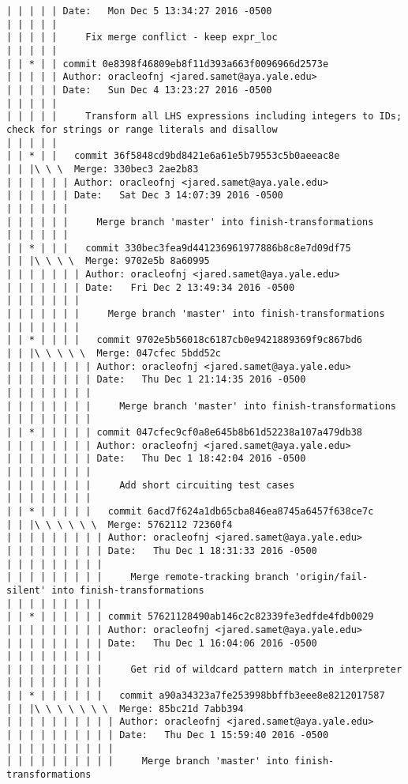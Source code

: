 \begin{lstlisting}
| | | | | Date:   Mon Dec 5 13:34:27 2016 -0500
| | | | | 
| | | | |     Fix merge conflict - keep expr_loc
| | | | |      
| | * | | commit 0e8398f46809eb8f11d393a663f0096966d2573e
| | | | | Author: oracleofnj <jared.samet@aya.yale.edu>
| | | | | Date:   Sun Dec 4 13:23:27 2016 -0500
| | | | | 
| | | | |     Transform all LHS expressions including integers to IDs; check for strings or range literals and disallow
| | | | |        
| | * | |   commit 36f5848cd9bd8421e6a61e5b79553c5b0aeeac8e
| | |\ \ \  Merge: 330bec3 2ae2b83
| | | | | | Author: oracleofnj <jared.samet@aya.yale.edu>
| | | | | | Date:   Sat Dec 3 14:07:39 2016 -0500
| | | | | | 
| | | | | |     Merge branch 'master' into finish-transformations
| | | | | |         
| | * | | |   commit 330bec3fea9d441236961977886b8c8e7d09df75
| | |\ \ \ \  Merge: 9702e5b 8a60995
| | | | | | | Author: oracleofnj <jared.samet@aya.yale.edu>
| | | | | | | Date:   Fri Dec 2 13:49:34 2016 -0500
| | | | | | | 
| | | | | | |     Merge branch 'master' into finish-transformations
| | | | | | |          
| | * | | | |   commit 9702e5b56018c6187cb0e9421889369f9c867bd6
| | |\ \ \ \ \  Merge: 047cfec 5bdd52c
| | | | | | | | Author: oracleofnj <jared.samet@aya.yale.edu>
| | | | | | | | Date:   Thu Dec 1 21:14:35 2016 -0500
| | | | | | | | 
| | | | | | | |     Merge branch 'master' into finish-transformations
| | | | | | | |         
| | * | | | | | commit 047cfec9cf0a8e645b8b61d52238a107a479db38
| | | | | | | | Author: oracleofnj <jared.samet@aya.yale.edu>
| | | | | | | | Date:   Thu Dec 1 18:42:04 2016 -0500
| | | | | | | | 
| | | | | | | |     Add short circuiting test cases
| | | | | | | |           
| | * | | | | |   commit 6acd7f624a1db65cba846ea8745a6457f638ce7c
| | |\ \ \ \ \ \  Merge: 5762112 72360f4
| | | | | | | | | Author: oracleofnj <jared.samet@aya.yale.edu>
| | | | | | | | | Date:   Thu Dec 1 18:31:33 2016 -0500
| | | | | | | | | 
| | | | | | | | |     Merge remote-tracking branch 'origin/fail-silent' into finish-transformations
| | | | | | | | |          
| | * | | | | | | commit 57621128490ab146c2c82339fe3edfde4fdb0029
| | | | | | | | | Author: oracleofnj <jared.samet@aya.yale.edu>
| | | | | | | | | Date:   Thu Dec 1 16:04:06 2016 -0500
| | | | | | | | | 
| | | | | | | | |     Get rid of wildcard pattern match in interpreter
| | | | | | | | |            
| | * | | | | | |   commit a90a34323a7fe253998bbffb3eee8e8212017587
| | |\ \ \ \ \ \ \  Merge: 85bc21d 7abb394
| | | | | | | | | | Author: oracleofnj <jared.samet@aya.yale.edu>
| | | | | | | | | | Date:   Thu Dec 1 15:59:40 2016 -0500
| | | | | | | | | | 
| | | | | | | | | |     Merge branch 'master' into finish-transformations

\end{lstlisting}
